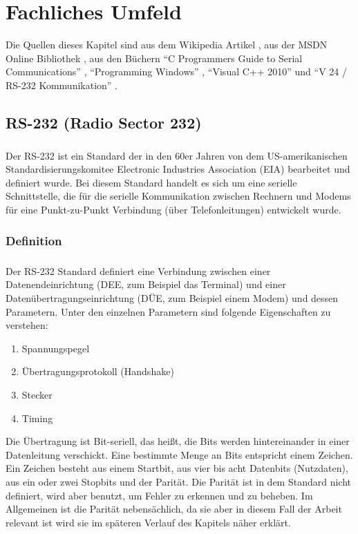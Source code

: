 \chapter{Fachliches Umfeld}\label{chp:fachlichesumfeld}
Die Quellen dieses Kapitel sind aus dem Wikipedia Artikel \cite{RS232}, aus der MSDN Online Bibliothek \cite{SerialCommunications}, aus den Büchern "`C Programmers Guide to Serial Communications"' \cite{CProgrammersGuide}, "`Programming Windows"' \cite{ProgrammingWindows}, "`Visual C++ 2010"'\cite{VisualC++} und "`V 24 / RS-232 Kommunikation"' \cite{V24/RS232}.\\

\section{RS-232 (Radio Sector 232)}
\paragraph{}
Der RS-232 ist ein Standard der in den 60er Jahren von dem US-amerikanischen Standardisierungskomitee Electronic Industries Association (EIA) bearbeitet und definiert wurde. Bei diesem Standard handelt es sich um eine serielle Schnittstelle, die für die serielle Kommunikation zwischen Rechnern und Modems für eine Punkt-zu-Punkt Verbindung  (über Telefonleitungen) entwickelt wurde.


\subsection{Definition}
\paragraph{}
Der RS-232 Standard definiert eine Verbindung zwischen einer Datenendeinrichtung (DEE, zum Beispiel das Terminal) und einer Datenübertragungseinrichtung (DÜE, zum Beispiel einem Modem) und dessen Parametern. Unter den einzelnen Parametern sind folgende Eigenschaften zu verstehen:
\begin{enumerate}
\item Spannungspegel
\item Übertragungsprotokoll (Handshake)
\item Stecker
\item Timing
\end{enumerate}

Die Übertragung ist Bit-seriell, das heißt, die Bits werden hintereinander in einer Datenleitung verschickt. Eine bestimmte Menge an Bits entspricht einem Zeichen. Ein Zeichen besteht aus einem Startbit, aus vier bis acht Datenbits (Nutzdaten), aus ein oder zwei Stopbits und der Parität. Die Parität ist in dem Standard nicht definiert, wird aber benutzt, um Fehler zu erkennen und zu beheben. Im Allgemeinen ist die Parität nebensächlich, da sie aber in diesem Fall der Arbeit relevant ist wird sie im späteren Verlauf des Kapitels näher erklärt.


